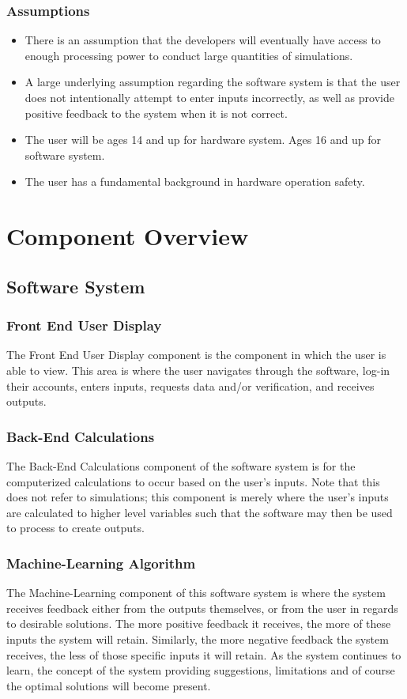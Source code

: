 \documentclass[12pt, titlepage]{article}
\begin{document}
\subsubsection{Assumptions}
\begin{itemize}
    \item There is an assumption that the developers will eventually have access to enough processing power to conduct large quantities of simulations.
    \item A large underlying assumption regarding the software system is that the user does not intentionally attempt to enter inputs incorrectly, as well as provide positive feedback to the system when it is not correct.
    \item The user will be ages 14 and up for hardware system. Ages 16 and up for software system.
    \item The user has a fundamental background in hardware operation safety.

\end{itemize}


\section{Component Overview}

\subsection{Software System}
\subsubsection{Front End User Display}
The Front End User Display component is the component in which the user is able to view. This area is where the user navigates through the software, log-in their accounts, enters inputs, requests data and/or verification, and receives outputs.

\subsubsection{Back-End Calculations}
The Back-End Calculations component of the software system is for the computerized calculations to occur based on the user’s inputs. Note that this does not refer to simulations; this component is merely where the user’s inputs are calculated to higher level variables such that the software may then be used to process to create outputs. 

\subsubsection{Machine-Learning Algorithm}
The Machine-Learning component of this software system is where the system receives feedback either from the outputs themselves, or from the user in regards to desirable solutions. The more positive feedback it receives, the more of these inputs the system will retain. Similarly, the more negative feedback the system receives, the less of those specific inputs it will retain. As the system continues to learn, the concept of the system providing suggestions, limitations and of course the optimal solutions will become present. 
\end{document}
